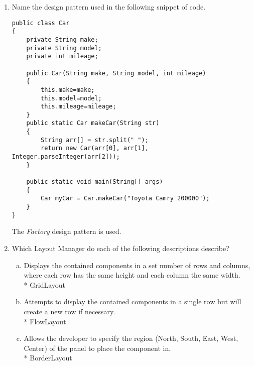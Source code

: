 \documentclass[11pt]{article}
\newenvironment{answer}{\large\lstset{basicstyle=\large}\color{white}}{}
\newenvironment{answer}{\large\lstset{basicstyle=\large}\color{red}}{}
\begin{document}
\begin{enumerate}
\item Name the design pattern used in the following snippet of code.
\begin{lstlisting}
public class Car
{
	private String make;
	private String model;
	private int mileage;

	public Car(String make, String model, int mileage)
	{
		this.make=make;
		this.model=model;
		this.mileage=mileage;
	}
	public static Car makeCar(String str)
	{
		String arr[] = str.split(" ");
		return new Car(arr[0], arr[1], Integer.parseInteger(arr[2]));
	}

	public static void main(String[] args)
	{
		Car myCar = Car.makeCar("Toyota Camry 200000");
	}
}
\end{lstlisting}

\begin{answer}
The \emph{Factory} design pattern is used.
\vspace{.5in}
\end{answer}

\item Which Layout Manager do each of the following descriptions describe?
\begin{enumerate}[(a)]

\item Displays the contained components in a set number of rows and columns,
where each row has the same height and each column the same width.\\*
\begin{answer}
GridLayout
\vspace{.5in}
\end{answer}

\item Attempts to display the contained components in a single row but will
create a new row if necessary.\\*
\begin{answer}
FlowLayout
\vspace{.5in}
\end{answer}

\item Allows the developer to specify the region (North, South, East, West, Center) of the panel to place the component in.\\*
\begin{answer}
BorderLayout
\vspace{.5in}
\end{answer}

\end{enumerate}


\end{enumerate}
\end{document}
